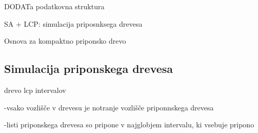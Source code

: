 DODATa podatkovna struktura

SA + LCP: simulacija priposnksega drevesa


Osnova za kompaktno priponsko drevo


\cite{Abouelhoda2004}   

\cite{Manber1990}

\subsection{Simulacija priponskega drevesa}\label{sec:STsimulacija}

drevo lcp intervalov 

-vsako vozlišče v drevesu je notranje vozlišče priponnskega drevesa\cite{Abouelhoda2004}

-listi priponskega drevesa so pripone v najglobjem intervalu, ki vsebuje pripono

\cite{Kasai2001}